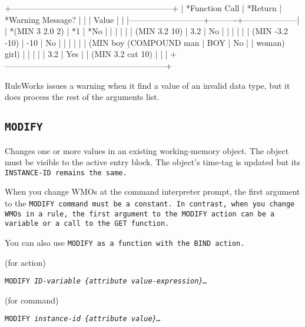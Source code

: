 +-----------------------------------------------------------+
| *Function Call           | *Return | *Warning Message? |
|                           |   Value  |                    |
|---------------------------+----------+--------------------|
| *(MIN 3 2.0 2)           | *1      | *No               |
|                           |          |                    |
|   (MIN 3.2 10)            |   3.2    |   No               |
|                           |          |                    |
|   (MIN -3.2 -10)          |   -10    |   No               |
|                           |          |                    |
|   (MIN boy (COMPOUND man  |   BOY    |   No               |
|   woman) girl)            |          |                    |
|                           |   3.2    |   Yes              |
|   (MIN 3.2 cat 10)        |          |                    |
+-----------------------------------------------------------+

\begin{note}
  RuleWorks issues a warning when it find a value of an invalid data
  type, but it does process the rest of the arguments list.
\end{note}

\subsection{\tt{MODIFY}}

Changes one or more values in an existing working-memory object. The
object must be visible to the active entry block.  The object's
time-tag is updated but its \tt{INSTANCE-ID} remains the same.

\begin{note}
  When you change WMOs at the command interpreter prompt, the first
  argument to the \tt{MODIFY} command must be a constant.  In
  contrast, when you change WMOs in a rule, the first argument to the
  \tt{MODIFY} action can be a variable or a call to the \tt{GET}
  function.
\end{note}

You can also use \tt{MODIFY} as a function with the \tt{BIND} action.

\Format (for action)

\tt{MODIFY} \it{ID-variable} \{\ct\it{attribute} \it{value-expression}\}\ldots

\Format (for command)

\tt{MODIFY} \it{instance-id} \{\ct\it{attribute} \it{value}\}\ldots

